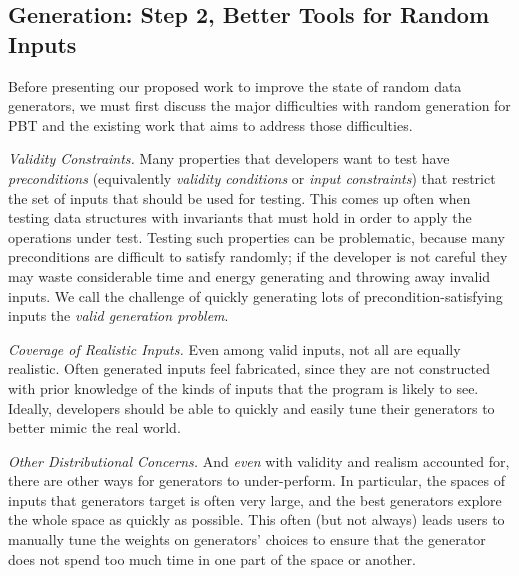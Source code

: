 \subsection{Generation: Step 2, Better Tools for Random Inputs }

%
Before presenting our proposed work to improve the state of random data
generators, we must first discuss the major difficulties with random generation
for PBT and the existing work that aims to address those difficulties.

{\em Validity Constraints.}
Many properties that developers want to test have {\em preconditions}
(equivalently {\em validity conditions} or {\em input constraints}) that
restrict the set of inputs that should be used for testing. This comes up often
when testing data structures with invariants that must hold in order to apply
the operations under test.  Testing such properties can be problematic, because
many preconditions are difficult to satisfy randomly; if the developer is not
careful they may waste considerable time and energy generating and throwing away
invalid inputs. We call the challenge of quickly generating lots of
precondition-satisfying inputs the {\em valid generation problem}.

{\em Coverage of Realistic Inputs.}
Even among valid inputs, not all are equally realistic. Often generated inputs
feel fabricated, since they are not constructed with prior knowledge of the
kinds of inputs that the program is likely to see. Ideally, developers should be
able to quickly and easily tune their generators to better mimic the real world.

{\em Other Distributional Concerns.}
And {\em even} with validity and realism accounted for, there are other ways for
generators to under-perform. In particular, the spaces of inputs that generators
target is often very large, and the best generators explore the whole space as
quickly as possible. This often (but not always) leads users to manually tune
the weights on generators' choices to ensure that the generator does not spend
too much time in one part of the space or another.

